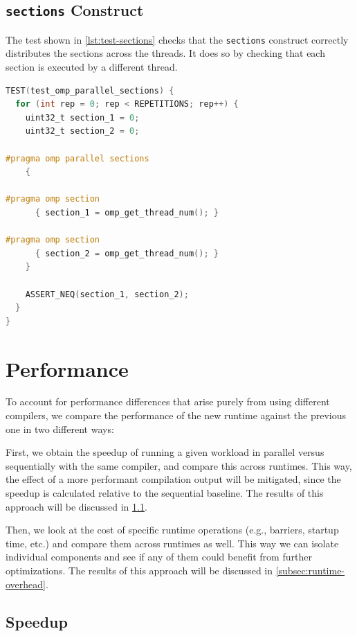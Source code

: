 \subsection{\texttt{sections} Construct}

The test shown in \cref{lst:test-sections} checks that the \texttt{sections} construct correctly
distributes the sections across the threads. It does so by checking that each section is executed by
a different thread.

\begin{lstlisting}[language=C, caption={test_omp_parallel_sections}, label={lst:test-sections}]
TEST(test_omp_parallel_sections) {
  for (int rep = 0; rep < REPETITIONS; rep++) {
    uint32_t section_1 = 0;
    uint32_t section_2 = 0;

#pragma omp parallel sections
    {

#pragma omp section
      { section_1 = omp_get_thread_num(); }

#pragma omp section
      { section_2 = omp_get_thread_num(); }
    }

    ASSERT_NEQ(section_1, section_2);
  }
}
\end{lstlisting}

\section{Performance}

To account for performance differences that arise purely from using different compilers, we compare
the performance of the new runtime against the previous one in two different ways:

First, we obtain the speedup of running a given workload in parallel versus sequentially with the
same compiler, and compare this across runtimes. This way, the effect of a more performant
compilation output will be mitigated, since the speedup is calculated relative to the sequential
baseline. The results of this approach will be discussed in \cref{subsec:speedup}.

Then, we look at the cost of specific runtime operations (e.g., barriers, startup time, etc.)
and compare them across runtimes as well. This way we can isolate individual components and see
if any of them could benefit from further optimizations. The results of this approach will be
discussed in \cref{subsec:runtime-overhead}.

\subsection{Speedup}
\label{subsec:speedup}

